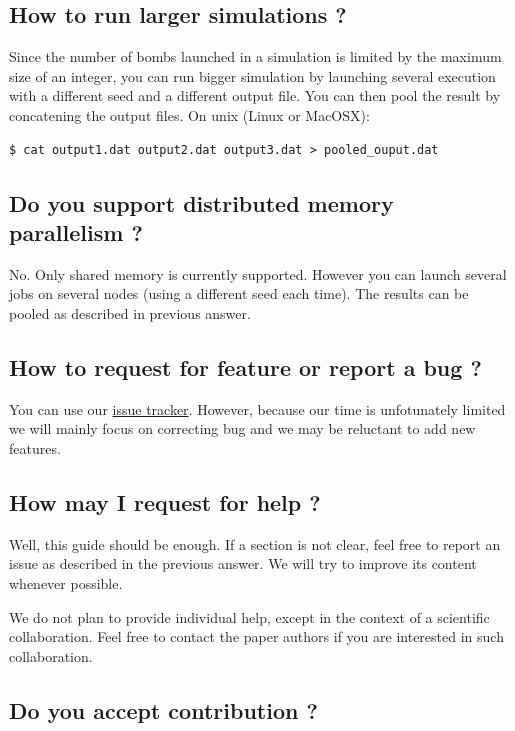 \documentclass[10pt,a4paper]{article}
\begin{document}
\subsection{How to run larger simulations ?}
\label{sec-6-5}

Since the number of bombs launched in a simulation is limited by the maximum
size of an integer, you can run bigger simulation by launching several
execution with a different seed and a different output file. You can then 
pool the result by concatening the output files. On unix (Linux or MacOSX):

\begin{verbatim}
$ cat output1.dat output2.dat output3.dat > pooled_ouput.dat
\end{verbatim}

\subsection{Do you support distributed memory parallelism ?}
\label{sec-6-6}

No. Only shared memory is currently supported. However you can launch 
several jobs on several nodes (using a different seed each time). The results
can be pooled as described in previous answer.

\subsection{How to request for feature or report a bug ?}
\label{sec-6-7}

You can use our \href{http://www.example.com/bugs}{issue tracker}. However, because our time is unfotunately limited
we will mainly focus on correcting bug and we may be reluctant to add new features.

\subsection{How may I request for help ?}
\label{sec-6-8}

Well, this guide should be enough. If a section is not clear, feel free to
report an issue as described in the previous answer. We will try to
improve its content whenever possible.

We do not plan to provide individual help, except in the context of a
scientific collaboration. Feel free to contact the paper authors if
you are interested in such collaboration.

\subsection{Do you accept contribution ?}
\label{sec-6-9}
\end{document}
